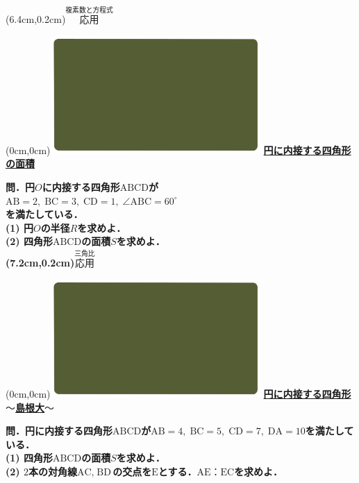 \documentclass[10pt,
fleqn,
dvipdfmx,
uplatex
]{jsarticle}
\begin{document}
\at(6.4cm,0.2cm){\small\color{bradorange}$\overset{\text{複素数と方程式}}{\text{応用}}$}


\newpage

\at(0cm,0cm){\includegraphics[width=8cm,bb=0 0 1920 1080]{./youtube/thumbnails/templates/smart_background/三角比.jpeg}}
{\color{orange}\bf\boldmath\Large\underline{円に内接する四角形の面積}}\vspace{0.3zw}

\normalsize 
\bf\boldmath 問．円$O$に内接する四角形$\text{ABCD}$が\\
\hspace{0.3zw}$\text{AB}=2,\;\text{BC}=3,\;\text{CD}=1,\;\angle \text{ABC}={60}^\circ$\\
を満たしている．\\
\large
(1)  円$O$の半径$R$を求めよ．\\
(2)  四角形$\text{ABCD}$の面積$S$を求めよ．\\

\at(7.2cm,0.2cm){\small\color{bradorange}$\overset{\text{三角比}}{\text{応用}}$}



\newpage

\at(0cm,0cm){\includegraphics[width=8cm,bb=0 0 1920 1080]{./youtube/thumbnails/templates/smart_background/三角比.jpeg}}
{\color{orange}\bf\boldmath\Large\underline{円に内接する四角形$〜$島根大$〜$}}\vspace{0.3zw}

\large 
\bf\boldmath 問．円に内接する四角形$\text{ABCD}$が$\text{AB}=4,\;\text{BC}=5,\;\text{CD}=7,\;\text{DA}={10}$を満たしている．\\
(1)  四角形$\text{ABCD}$の面積$S$を求めよ．\\
(2)  $2$本の対角線$\text{AC},\;\text{BD}$の交点を$\text{E}$とする．$\text{AE}：\text{EC}$を求めよ．\\
\end{document}

